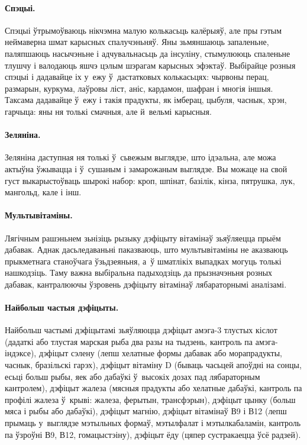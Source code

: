 \paragraph{Спэцыі.}
Спэцыі ўтрымоўваюць нікчэмна малую колькасьць калёрыяў, але пры гэтым неймаверна шмат карысных спалучэньняў. Яны зьмяншаюць запаленьне, паляпшаюць насычэньне і адчувальнасьць да інсуліну, стымулююць спаленьне тлушчу і валодаюць яшчэ цэлым шэрагам карысных эфэктаў. Выбірайце розныя спэцыі і дадавайце іх у~ежу ў~дастатковых колькасьцях: чырвоны перац, размарын, куркума, лаўровы ліст, аніс, кардамон, шафран і многія іншыя. Таксама дадавайце ў~ежу і такія прадукты, як імберац, цыбуля, часнык, хрэн, гарчыца: яны ня толькі смачныя, але й~вельмі карысныя.

\paragraph{Зеляніна.}
Зеляніна даступная ня толькі ў~сьвежым выглядзе, што ідэальна, але можа актыўна ўжывацца і ў~сушаным і замарожаным выглядзе. Вы можаце на свой густ выкарыстоўваць шырокі набор: кроп, шпінат, базілік, кінза, пятрушка, лук, мангольд, кале і інш.

\paragraph{Мультывітаміны.}
Лягічным рашэньнем зьнізіць рызыку дэфіцыту вітамінаў зьяўляецца прыём дабавак. Аднак дасьледаваньні паказваюць, што мультывітаміны не аказваюць прыкметнага станоўчага ўзьдзеяньня, а~ў шматлікіх выпадках могуць толькі нашкодзіць. Таму важна выбіральна падыходзіць да прызначэньня розных дабавак, кантралюючы ўзровень дэфіцыту вітамінаў лябараторнымі аналізамі.


\paragraph{Найбольш частыя дэфіцыты.}
Найбольш частымі дэфіцытамі зьяўляюцца дэфіцыт амэга-3 тлустых кіслот (дадаткі або тлустая марская рыба два разы на тыдзень, кантроль па амэга-індэксе), дэфіцыт сэлену (лепш хелатные формы дабавак або морапрадукты, часнык, бразільскі гарэх), дэфіцыт вітаміну D (бываць часьцей апоўдні на сонцы, есьці больш рыбы, яек або дабаўкі ў~высокіх дозах пад лябараторным кантролем), дэфіцыт жалеза (мясныя прадукты або хелатные дабаўкі, кантроль па профілі жалеза ў~крыві: жалеза, ферытын, трансфэрын), дэфіцыт цынку (больш мяса і рыбы або дабаўкі), дэфіцыт магнію, дэфіцыт вітамінаў В9 і В12 (лепш прымаць у~выглядзе мэтыльных формаў, мэтылфалат і мэтылкабаламін, кантроль па ўзроўні В9, В12, гомацыстэіну), дэфіцыт ёду (цяпер сустракаецца ўсё радзей).

